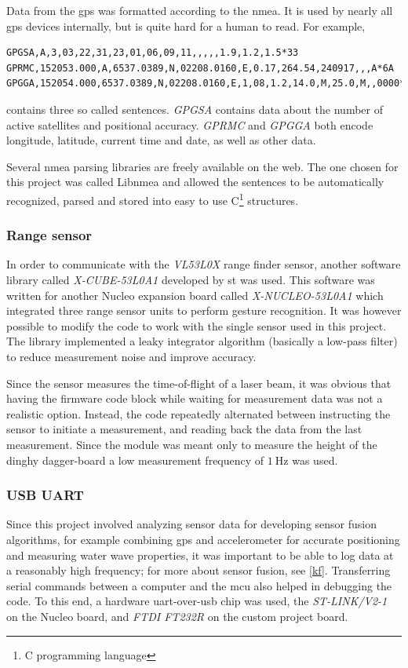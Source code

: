 Data from the \gls{gps} was formatted according to the \gls{nmea}. It is used by nearly all \gls{gps} devices internally, but is quite hard for a human to read. For example,
\begin{lstlisting}
GPGSA,A,3,03,22,31,23,01,06,09,11,,,,,1.9,1.2,1.5*33
GPRMC,152053.000,A,6537.0389,N,02208.0160,E,0.17,264.54,240917,,,A*6A
GPGGA,152054.000,6537.0389,N,02208.0160,E,1,08,1.2,14.0,M,25.0,M,,0000*68
\end{lstlisting}
contains three so called sentences. \emph{GPGSA} contains data about the number of active satellites and positional accuracy. \emph{GPRMC} and \emph{GPGGA} both encode longitude, latitude, current time and date, as well as other data.

Several \gls{nmea} parsing libraries are freely available on the web. The one chosen for this project was called Libnmea\cite{libnmea} and allowed the sentences to be automatically recognized, parsed and stored into easy to use C\footnote{C programming language} structures.

\subsubsection{Range sensor}
In order to communicate with the \emph{VL53L0X} range finder sensor, another software library called \emph{X-CUBE-53L0A1}\cite{x-cube-53l0a} developed by \gls{st} was used. This software was written for another Nucleo expansion board called \emph{X-NUCLEO-53L0A1} which integrated three range sensor units to perform gesture recognition. It was however possible to modify the code to work with the single sensor used in this project. The library implemented a leaky integrator algorithm (basically a low-pass filter) to reduce measurement noise and improve accuracy.

Since the sensor measures the time-of-flight of a laser beam, it was obvious that having the firmware code block while waiting for measurement data was not a realistic option. Instead, the code repeatedly alternated between instructing the sensor to initiate a measurement, and reading back the data from the last measurement. Since the module was meant only to measure the height of the dinghy dagger-board  a low measurement frequency of $1~\textrm{Hz}$ was used.

\subsubsection{USB UART}
\label{usb-uart}
Since this project involved analyzing sensor data for developing sensor fusion algorithms, for example combining \gls{gps} and accelerometer for accurate positioning and measuring water wave properties, it was important to be able to log data at a reasonably high frequency; for more about sensor fusion, see \autoref{kf}. Transferring serial commands between a computer and the \gls{mcu} also helped in debugging the code. To this end, a hardware \gls{uart}-over-\gls{usb} chip was used, the \emph{ST-LINK/V2-1} on the Nucleo board, and \emph{FTDI FT232R} on the custom project board.

